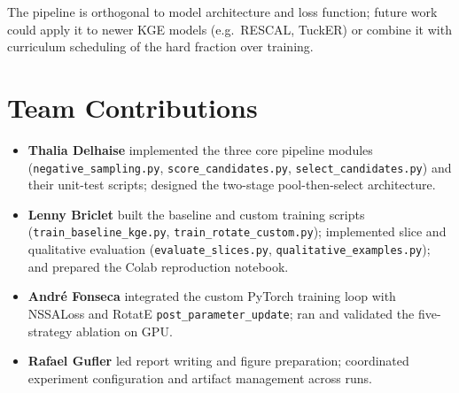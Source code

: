 \documentclass[10pt,twocolumn,letterpaper]{article}
\begin{document}
The pipeline is orthogonal to model architecture and loss function; future
work could apply it to newer KGE models (e.g.\ RESCAL, TuckER) or combine
it with curriculum scheduling of the hard fraction over training.

\section{Team Contributions}
\label{sec:contributions}
\begin{itemize}
  \item \textbf{Thalia Delhaise} implemented the three core pipeline modules
    (\texttt{negative\_sampling.py}, \texttt{score\_candidates.py},
    \texttt{select\_candidates.py}) and their unit-test scripts; designed the
    two-stage pool-then-select architecture.
  \item \textbf{Lenny Briclet} built the baseline and custom training scripts
    (\texttt{train\_baseline\_kge.py}, \texttt{train\_rotate\_custom.py});
    implemented slice and qualitative evaluation
    (\texttt{evaluate\_slices.py}, \texttt{qualitative\_examples.py}); and
    prepared the Colab reproduction notebook.
  \item \textbf{Andr\'e Fonseca} integrated the custom PyTorch training loop
    with NSSALoss and RotatE \texttt{post\_parameter\_update}; ran and
    validated the five-strategy ablation on GPU.
  \item \textbf{Rafael Gufler} led report writing and figure preparation;
    coordinated experiment configuration and artifact management across runs.
\end{itemize}

{\small


}
\end{document}
